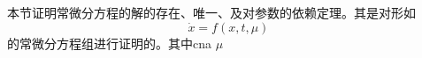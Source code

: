 
本节证明常微分方程的解的存在、唯一、及对参数的依赖定理。其是对形如
\begin{equation}
\dot x=f(x,t,\mu)~
\end{equation}
的常微分方程组进行证明的。其中cna $\mu$  